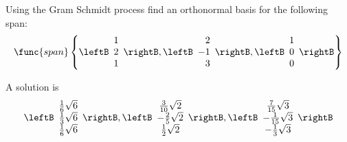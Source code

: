 \begin{enumialphparenastyle}
\begin{ex} Using the Gram Schmidt process find an
orthonormal basis for the following span:
 \[
\func{span} \left\{ \leftB
\begin{array}{r}
1 \\
2 \\
1
\end{array}
\rightB ,\leftB
\begin{array}{r}
2 \\
-1 \\
3
\end{array}
\rightB , \leftB
\begin{array}{r}
1 \\
0 \\
0
\end{array}
\rightB \right\}
\]
\begin{sol}
A solution is 
\[
\leftB
\begin{array}{c}
\frac{1}{6}\sqrt{6} \\
\frac{1}{3}\sqrt{6} \\
\frac{1}{6}\sqrt{6}
\end{array}
\rightB ,\leftB
\begin{array}{c}
\frac{3}{10}\sqrt{2} \\
-\frac{2}{5}\sqrt{2} \\
\frac{1}{2}\sqrt{2}
\end{array}
\rightB ,\leftB
\begin{array}{c}
\frac{7}{15}\sqrt{3} \\
-\frac{1}{15}\sqrt{3} \\
-\frac{1}{3}\sqrt{3}
\end{array}
\rightB
\]
\end{sol}
\end{ex}


\end{enumialphparenastyle}
